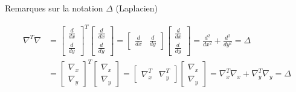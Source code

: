 \begin{frame}{Remarques sur la notation $\Delta$ (Laplacien)}

\begin{align*}
\nabla^{T} \nabla &= \begin{bmatrix} 
\frac{d}{dx} \\ 
\frac{d}{dy} 
\end{bmatrix}^{T}
\begin{bmatrix} 
\frac{d}{dx} \\ 
\frac{d}{dy} 
\end{bmatrix}
= \begin{bmatrix} 
\frac{d}{dx} & \frac{d}{dy} 
\end{bmatrix} \begin{bmatrix} 
\frac{d}{dx} \\ 
\frac{d}{dy} 
\end{bmatrix}
= \frac{d^{2}}{dx^{2}} + \frac{d^{2}}{dy^{2}}
= \Delta \\
&= \begin{bmatrix} 
\nabla_{x} \\ 
\nabla_{y} 
\end{bmatrix}^{T}
\begin{bmatrix} 
\nabla_{x} \\ 
\nabla_{y} 
\end{bmatrix}
= \begin{bmatrix} 
\nabla_{x}^{T} & \nabla_{y}^{T}
\end{bmatrix} \begin{bmatrix} 
\nabla_{x} \\ 
\nabla_{y} 
\end{bmatrix}
= \nabla_{x}^{T} \nabla_{x} + \nabla_{y}^{T} \nabla_{y}
= \Delta \\
\end{align*}

\end{frame}

